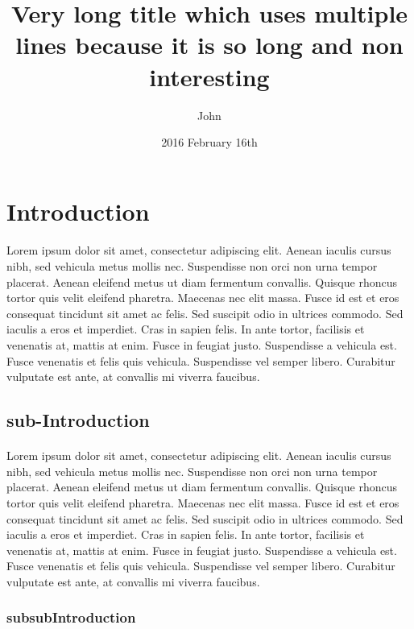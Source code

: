 \documentclass[11pt]{bioinlab}
\title{Very long title which uses multiple lines because it is so long and non interesting}
\author{John \bsc{Doe}}
\date{2016 February 16th}
\begin{document}
\maketitle

\newpage
\tableofcontents

\newpage

\section{Introduction}
\paragraph{}Lorem ipsum dolor sit amet, consectetur adipiscing elit. Aenean iaculis cursus nibh, sed vehicula metus mollis nec. Suspendisse non orci non urna tempor placerat. Aenean eleifend metus ut diam fermentum convallis. Quisque rhoncus tortor quis velit eleifend pharetra. Maecenas nec elit massa. Fusce id est et eros consequat tincidunt sit amet ac felis. Sed suscipit odio in ultrices commodo. Sed iaculis a eros et imperdiet. Cras in sapien felis. In ante tortor, facilisis et venenatis at, mattis at enim. Fusce in feugiat justo. Suspendisse a vehicula est. Fusce venenatis et felis quis vehicula. Suspendisse vel semper libero. Curabitur vulputate est ante, at convallis mi viverra faucibus.
\subsection{sub-Introduction}
\paragraph{}Lorem ipsum dolor sit amet, consectetur adipiscing elit. Aenean iaculis cursus nibh, sed vehicula metus mollis nec. Suspendisse non orci non urna tempor placerat. Aenean eleifend metus ut diam fermentum convallis. Quisque rhoncus tortor quis velit eleifend pharetra. Maecenas nec elit massa. Fusce id est et eros consequat tincidunt sit amet ac felis. Sed suscipit odio in ultrices commodo. Sed iaculis a eros et imperdiet. Cras in sapien felis. In ante tortor, facilisis et venenatis at, mattis at enim. Fusce in feugiat justo. Suspendisse a vehicula est. Fusce venenatis et felis quis vehicula. Suspendisse vel semper libero. Curabitur vulputate est ante, at convallis mi viverra faucibus.
\subsubsection{subsubIntroduction}
\end{document}
